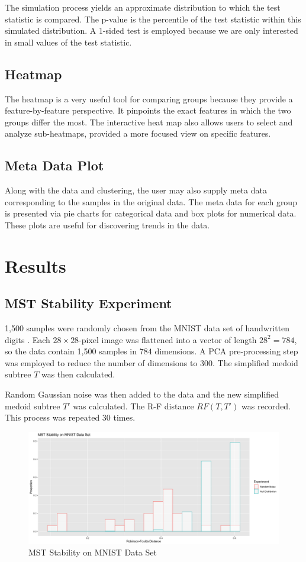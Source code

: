 \documentclass{article}
\begin{document}
The simulation process yields an approximate distribution to which the test statistic is compared. The p-value is the percentile of the test statistic within this simulated distribution. A 1-sided test is employed because we are only interested in small values of the test statistic.

\subsection{Heatmap}
The heatmap is a very useful tool for comparing groups because they provide a feature-by-feature perspective. It pinpoints the exact features in which the two groups differ the most. The interactive heat map also allows users to select and analyze sub-heatmaps, provided a more focused view on specific features.

\subsection{Meta Data Plot}
Along with the data and clustering, the user may also supply meta data corresponding to the samples in the original data. The meta data for each group is presented via pie charts for categorical data and box plots for numerical data. These plots are useful for discovering trends in the data.

\section{Results}

\subsection{MST Stability Experiment}
1,500 samples were randomly chosen from the MNIST data set of handwritten digits \cite{MNIST}. Each $28 \times 28$-pixel image was flattened into a vector of length $28^2 = 784$, so the data contain 1,500 samples in $784$ dimensions. A PCA pre-processing step was employed to reduce the number of dimensions to 300. The simplified medoid subtree $T$ was then calculated.

Random Gaussian noise was then added to the data and the new simplified medoid subtree $T'$ was calculated. The R-F distance $RF(T, T')$ was recorded. This process was repeated 30 times.

\renewcommand{\figurename}{Figure}
\renewcommand{\thefigure}{1}
\begin{figure}[!t]
\centering
\includegraphics[scale=0.3]{RF stability}
\caption{MST Stability on MNIST Data Set}
\end{figure}
\end{document}
